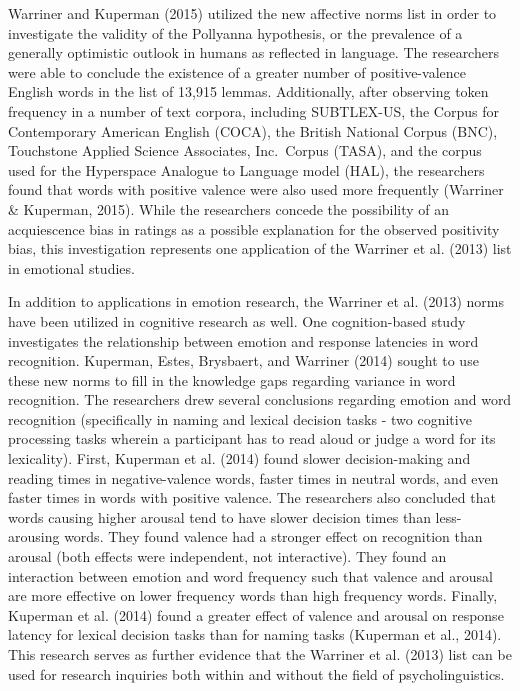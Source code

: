 \documentclass[english,,man]{apa6}
\begin{document}
Warriner and Kuperman (2015) utilized the new affective norms list in order to investigate the validity of the Pollyanna hypothesis, or the prevalence of a generally optimistic outlook in humans as reflected in language. The researchers were able to conclude the existence of a greater number of positive-valence English words in the list of 13,915 lemmas. Additionally, after observing token frequency in a number of text corpora, including SUBTLEX-US, the Corpus for Contemporary American English (COCA), the British National Corpus (BNC), Touchstone Applied Science Associates, Inc.~Corpus (TASA), and the corpus used for the Hyperspace Analogue to Language model (HAL), the researchers found that words with positive valence were also used more frequently (Warriner \& Kuperman, 2015). While the researchers concede the possibility of an acquiescence bias in ratings as a possible explanation for the observed positivity bias, this investigation represents one application of the Warriner et al. (2013) list in emotional studies.

In addition to applications in emotion research, the Warriner et al. (2013) norms have been utilized in cognitive research as well. One cognition-based study investigates the relationship between emotion and response latencies in word recognition. Kuperman, Estes, Brysbaert, and Warriner (2014) sought to use these new norms to fill in the knowledge gaps regarding variance in word recognition. The researchers drew several conclusions regarding emotion and word recognition (specifically in naming and lexical decision tasks - two cognitive processing tasks wherein a participant has to read aloud or judge a word for its lexicality). First, Kuperman et al. (2014) found slower decision-making and reading times in negative-valence words, faster times in neutral words, and even faster times in words with positive valence. The researchers also concluded that words causing higher arousal tend to have slower decision times than less-arousing words. They found valence had a stronger effect on recognition than arousal (both effects were independent, not interactive). They found an interaction between emotion and word frequency such that valence and arousal are more effective on lower frequency words than high frequency words. Finally, Kuperman et al. (2014) found a greater effect of valence and arousal on response latency for lexical decision tasks than for naming tasks (Kuperman et al., 2014). This research serves as further evidence that the Warriner et al. (2013) list can be used for research inquiries both within and without the field of psycholinguistics.
\end{document}
